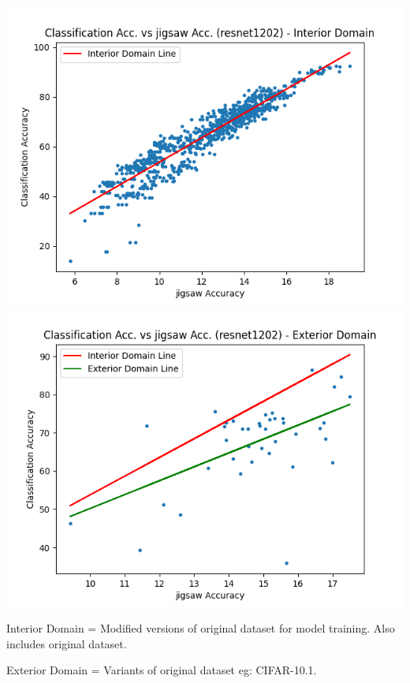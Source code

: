 \documentclass[a4paper]{article}
\begin{document}
{\begin{flushleft}
    \includegraphics[scale=0.16]{images/sample6.png}\includegraphics[scale=0.16]{images/sample7.png}

    \vspace{0.3cm}
    Interior Domain = Modified versions of original dataset for model training. Also includes original dataset.
    
    Exterior Domain = Variants of original dataset eg: CIFAR-10.1.

    \end{flushleft}
}

\end{document}
